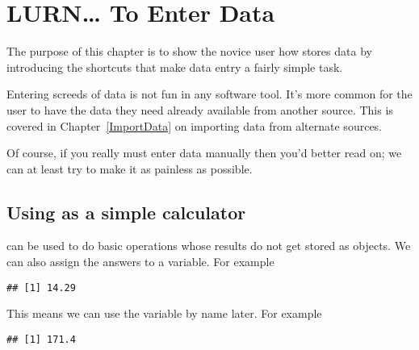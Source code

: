 

\chapter{LURN\ldots{} To Enter Data} 
\label{DataEntry} 
 
 
The purpose of this chapter is to show the novice \R{} user how \R{} stores data by introducing the shortcuts that make data entry a fairly simple task. 
 
Entering screeds of data is not fun in any software tool. It's more common for the \R{} user to have the data they need already available from another source. This is covered in Chapter~\ref{ImportData} on importing data from alternate sources. 
 
Of course, if you really must enter data manually then you'd better read on; we can at least try to make it as painless as possible. 
 
\section{Using \R{} as a simple calculator} 
\label{SimpleCalculator} 
 
\R{} can be used to do basic operations whose results do not get stored as objects. We can also assign the answers to a variable. For example 
\begin{knitrout}
\color{fgcolor}\begin{kframe}
\begin{alltt}
\hlkwb{=}\hlopt{/}
\end{alltt}
\begin{verbatim}
## [1] 14.29
\end{verbatim}
\end{kframe}
\end{knitrout}
This means we can use the variable by name later. For example 
\begin{knitrout}
\color{fgcolor}\begin{kframe}
\begin{alltt}
\hlopt{*}
\end{alltt}
\begin{verbatim}
## [1] 171.4
\end{verbatim}
\end{kframe}
\end{knitrout}
 
